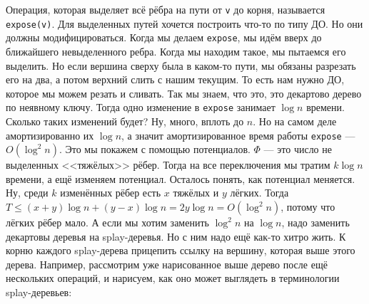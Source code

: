 \documentclass{article}
\newcommand{\pseudo}{PseudoLexer.py:PseudoLexer -x}
\newcommand{\pseudocode}[1]{\texttt{#1}}
\begin{document}
    Операция, которая выделяет всё рёбра на пути от \pseudocode{v} до корня, называется \pseudocode{expose(v)}. Для выделенных путей хочется построить что-то по типу ДО. Но они должны модифицироваться. Когда мы делаем \pseudocode{expose}, мы идём вверх до ближайшего невыделенного ребра. Когда мы находим такое, мы пытаемся его выделить. Но если вершина сверху была в каком-то пути, мы обязаны разрезать его на два, а потом верхний слить с нашим текущим. То есть нам нужно ДО, которое мы можем резать и сливать. Так мы знаем, что это, это декартово дерево по неявному ключу. Тогда одно изменение в \pseudocode{expose} занимает $\log n$ времени. Сколько таких изменений будет? Ну, много, вплоть до $n$. Но на самом деле амортизированно их $\log n$, а значит амортизированное время работы \pseudocode{expose} --- $O(\log^2n)$. Это мы покажем с помощью потенциалов. $\Phi$ --- это число не выделенных <<тяжёлых>> рёбер. Тогда на все переключения мы тратим $k\log n$ времени, а ещё изменяем потенциал. Осталось понять, как потенциал меняется. Ну, среди $k$ изменённых рёбер есть $x$ тяжёлых и $y$ лёгких. Тогда $T\leqslant(x+y)\log n+(y-x)\log n=2y\log n=O(\log^2n)$, потому что лёгких рёбер мало. А если мы хотим заменить $\log^2n$ на $\log n$, надо заменить декартовы деревья на splay-деревья. Но с ним надо ещё как-то хитро жить. К корню каждого splay-дерева прицепить ссылку на вершину, которая выше этого дерева. Например, рассмотрим уже нарисованное выше дерево после ещё нескольких операций, и нарисуем, как оно может выглядеть в терминологии splay-деревьев:
\end{document}
